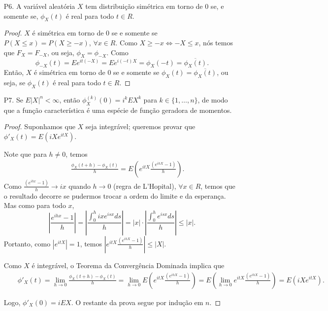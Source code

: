 \begin{frame}
\begin{enumerate}

\item[P6.] A variável aleatória $X$ tem distribuição simétrica em
torno de 0 se, e somente se, $\phi_X(t)$ é real para todo $t\in R$.

\begin{proof} $X$ é simétrica em torno de 0 se e somente se $P(X\leq
x)=P(X\geq -x)$, $\forall x\in R$. Como $X\geq -x \Leftrightarrow
-X\leq x$, nós temos que $F_X=F_{-X}$, ou seja, $\phi_X=\phi_{-X}$.
Como
%
$$\phi_{-X}(t)=Ee^{it(-X)}=Ee^{i(-t)X}=\phi_X(-t)=\overline{\phi_X(t)}.$$
Então, $X$ é simétrica em torno de 0 se e somente se
$\phi_X(t)=\overline{\phi_X(t)}$, ou seja, se $\phi_X(t)$ é real
para todo $t\in R$. \end{proof}
\end{enumerate}

\end{frame}


\begin{frame}
\begin{enumerate}


\item[P7.] Se $E|X|^n<\infty$, então $\phi_X^{(k)}(0)=i^kEX^k$ para $k\in\{1,\ldots,n\}$, de
modo que a função característica é uma espécie de função geradora de
momentos.

\begin{proof} Suponhamos que $X$ seja integrável; queremos provar que
$\phi'_X(t)=E(iXe^{itX})$.

Note que para $h\ne 0$, temos
\begin{eqnarray}
& & \frac{\phi_X(t+h)-\phi_X(t)}{h}=E(e^{itX}\frac{(e^{ihX}-1)}{h}).\nonumber
\end{eqnarray}
%
Como $\frac{(e^{ihx}-1)}{h}\rightarrow ix$ quando $h\rightarrow 0$
(regra de L'Hopital), $\forall x\in R$, temos que o resultado
decorre se pudermos trocar a ordem do limite e da esperança. Mas
como para todo $x$,
$$|\frac{e^{ihx}-1}{h}|=|\frac{\int_0^h ixe^{isx}ds}{h}|=|x|\cdot|\frac{\int_0^h e^{isx}ds}{h}|\leq |x|.$$
Portanto, como $|e^{itX}|=1$, temos
$|e^{itX}\frac{(e^{ihX}-1)}{h}|\leq |X|.$

Como $X$ é integrável, o Teorema da Convergência Dominada implica
que
\begin{eqnarray}
& & \phi'_X(t)=\lim_{h\rightarrow 0}\frac{\phi_X(t+h)-\phi_X(t)}{h}=\lim_{h\rightarrow
0}E(e^{itX}\frac{(e^{ihX}-1)}{h})=E(\lim_{h\rightarrow
0}e^{itX}\frac{(e^{ihX}-1)}{h}) =E(iXe^{itX}). \nonumber
\end{eqnarray}

Logo, $\phi'_X(0)=iEX$. O restante da prova segue por indução em
$n$. \end{proof}
\end{enumerate}

\end{frame}


